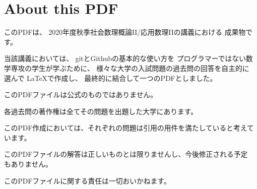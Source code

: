 \documentclass[../main]{subfiles}
\begin{document}
\section*{About this PDF}
このPDFは、
2020年度秋季社会数理概論II/応用数理IIの講義における
成果物です。

当該講義においては、
gitとGithubの基本的な使い方を
プログラマーではない数学専攻の学生が学ぶために、
様々な大学の入試問題の過去問の回答を自主的に選んで
\LaTeX で作成し、
最終的に結合して一つのPDFとしました。

このPDFファイルは公式のものではありません。

各過去問の著作権は全てその問題を出題した大学にあります。

このPDF作成においては、それぞれの問題は引用の用件を満たしていると考えています。

このPDFファイルの解答は正しいものとは限りませんし、今後修正される予定もありません。

このPDFファイルに関する責任は一切おいかねます。
\end{document}
